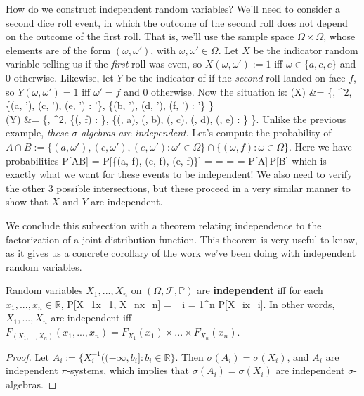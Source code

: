 \begin{example}
	How do we construct independent random variables? We'll need to consider a second dice roll event, in which the outcome of the second roll does not depend on the outcome of the first roll. That is, we'll use the sample space $\Omega\times\Omega$, whose elements are of the form $(\omega, \omega')$, with $\omega, \omega'\in \Omega$. Let $X$ be the indicator random variable telling us if the \textit{first} roll was even, so $X(\omega, \omega') := 1$ iff $\omega\in \{a, c, e\}$ and 0 otherwise. Likewise, let $Y$ be the indicator of if the \textit{second} roll landed on face $f$, so $Y(\omega, \omega') = 1$ iff $\omega' = f$ and 0 otherwise. Now the situation is:
	\eq
		\sigma(X) &= \{\emptyset, \Omega^2, \{(a, \omega'), (c, \omega'), (e, \omega') : \omega'\in\Omega\}, \{(b, \omega'), (d, \omega'), (f, \omega') : \omega'\in\Omega\} \} \\
		\sigma(Y) &= \{\emptyset, \Omega^2, \{(\omega, f) : \omega\in\Omega\}, \{(\omega, a), (\omega, b), (\omega, c), (\omega, d), (\omega, e) : \omega\in\Omega\} \}.
	\qe
	Unlike the previous example, \textit{these $\sigma$-algebras are independent}. Let's compute the probability of $A\cap B := \{(a, \omega'), (c, \omega'), (e, \omega') : \omega'\in\Omega\} \cap \{(\omega, f) : \omega\in\Omega \}$. Here we have probabilities
	\eq
		\mathbb P[A\cap B] = \mathbb P[\{(a, f), (c, f), (e, f)\}] =  =  = \times {} = \mathbb P[A]\,\mathbb P[B]
	\qe
	which is exactly what we want for these events to be independent! We also need to verify the other 3 possible intersections, but these proceed in a very similar manner to show that $X$ and $Y$ are independent. 
\end{example}

We conclude this subsection with a theorem relating independence to the factorization of a joint distribution function. This theorem is very useful to know, as it gives us a concrete corollary of the work we've been doing with independent random variables. 
\begin{theorem}\label{thm:factor_dist}
	Random variables $X_1, ..., X_n$ on $(\Omega, \mathcal F, \mathbb P)$ are \textbf{independent} iff for each $x_1, ..., x_n\in\mathbb R$, 
	\eq
		\mathbb P[X_1\leq x_1, X_n\leq x_n] = \prod_{i = 1}^n \mathbb P[X_i\leq x_i].
	\qe
	In other words, $X_1, ..., X_n$ are independent iff $F_{(X_1, ..., X_n)}(x_1, ..., x_n) = F_{X_1}(x_1)\times ... \times F_{X_n}(x_n)$. 
\end{theorem}
\begin{proof}
	Let $A_i := \{X_i^{-1}((-\infty, b_i] : b_i\in\mathbb R\}$. Then $\sigma(A_i) = \sigma(X_i)$, and $A_i$ are independent $\pi$-systems, which implies that $\sigma(A_i) = \sigma(X_i)$ are independent $\sigma$-algebras. 
\end{proof}

